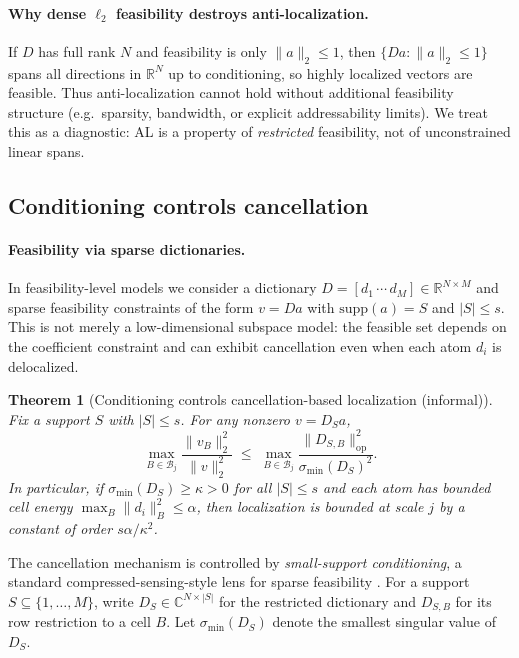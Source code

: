 \documentclass[11pt]{article}
\theoremstyle{plain}
\newtheorem{theorem}{Theorem}[section]
\theoremstyle{definition}
\theoremstyle{remark}
\newcommand{\C}{\mathbb{C}}
\begin{document}
\paragraph{Why dense \(\ell_2\) feasibility destroys anti-localization.}
If \(D\) has full rank \(N\) and feasibility is only \(\|a\|_2\le 1\), then \(\{Da:\|a\|_2\le 1\}\) spans all directions in \(\mathbb{R}^N\) up to conditioning, so highly localized vectors are feasible.
Thus anti-localization cannot hold without additional feasibility structure (e.g.\ sparsity, bandwidth, or explicit addressability limits).
We treat this as a diagnostic: AL is a property of \emph{restricted} feasibility, not of unconstrained linear spans.

\subsection{Conditioning controls cancellation}\label{subsec:conditioning_controls}

\paragraph{Feasibility via sparse dictionaries.}
In feasibility-level models we consider a dictionary \(D=[d_1\,\cdots\,d_M]\in\mathbb{R}^{N\times M}\) and sparse feasibility constraints of the form
\(v=Da\) with \(\mathrm{supp}(a)=S\) and \(|S|\le s\).
This is not merely a low-dimensional subspace model: the feasible set depends on the coefficient constraint and can exhibit cancellation even when each atom \(d_i\) is delocalized.

\begin{theorem}[Conditioning controls cancellation-based localization (informal)]\label{thm:conditioning-controls-localization}
Fix a support \(S\) with \(|S|\le s\). For any nonzero \(v=D_S a\),
\[
\max_{B\in\mathcal{B}_j}\frac{\|v_B\|_2^2}{\|v\|_2^2}\;\le\;
\max_{B\in\mathcal{B}_j}\frac{\|D_{S,B}\|_{\mathrm{op}}^2}{\sigma_{\min}(D_S)^2}.
\]
In particular, if \(\sigma_{\min}(D_S)\ge \kappa>0\) for all \(|S|\le s\) and each atom has bounded cell energy \(\max_{B}\|d_i\|_{B}^2\le \alpha\), then localization is bounded at scale \(j\) by a constant of order \(s\alpha/\kappa^2\).
\end{theorem}

The cancellation mechanism is controlled by \emph{small-support conditioning}, a standard compressed-sensing-style lens for sparse feasibility \cite{foucart_rauhut_2013}.
For a support \(S\subseteq \{1,\dots,M\}\), write \(D_S\in\C^{N\times |S|}\) for the restricted dictionary and \(D_{S,B}\) for its row restriction to a cell \(B\).
Let \(\sigma_{\min}(D_S)\) denote the smallest singular value of \(D_S\).
\end{document}
